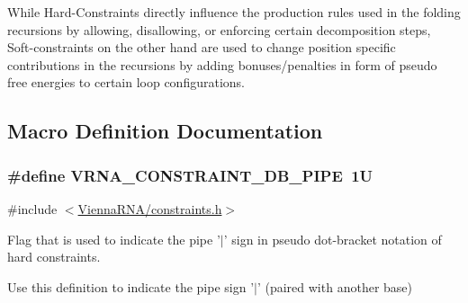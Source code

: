 While Hard-\/\-Constraints directly influence the production rules used in the folding recursions by allowing, disallowing, or enforcing certain decomposition steps, Soft-\/constraints on the other hand are used to change position specific contributions in the recursions by adding bonuses/penalties in form of pseudo free energies to certain loop configurations. 

\subsection{Macro Definition Documentation}
\hypertarget{group__constraints_ga13053547a2de5532b64b64d35e097ae1}{
\subsubsection[{V\-R\-N\-A\-\_\-\-C\-O\-N\-S\-T\-R\-A\-I\-N\-T\-\_\-\-D\-B\-\_\-\-P\-I\-P\-E}]{\setlength{\rightskip}{0pt plus 5cm}\#define V\-R\-N\-A\-\_\-\-C\-O\-N\-S\-T\-R\-A\-I\-N\-T\-\_\-\-D\-B\-\_\-\-P\-I\-P\-E~1\-U}}\label{group__constraints_ga13053547a2de5532b64b64d35e097ae1}


{\ttfamily \#include $<$\hyperlink{constraints_8h}{Vienna\-R\-N\-A/constraints.\-h}$>$}



Flag that is used to indicate the pipe '$\vert$' sign in pseudo dot-\/bracket notation of hard constraints. 

Use this definition to indicate the pipe sign '$\vert$' (paired with another base)

